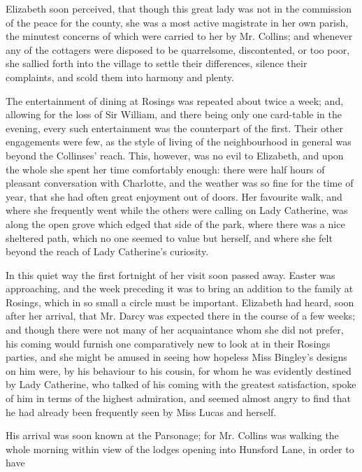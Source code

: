 Elizabeth soon perceived, that though this great lady was not in the commission of the peace for the county, she was a most active magistrate in her own parish, the minutest concerns of which were carried to her by Mr. Collins; and whenever any of the cottagers were disposed to be quarrelsome, discontented, or too poor, she sallied forth into the village to settle their differences, silence their complaints, and scold them into harmony and plenty.




The entertainment of dining at Rosings was repeated about twice a week; and, allowing for the loss of Sir William, and there being only one card-table in the evening, every such entertainment was the counterpart of the first. Their other engagements were few, as the style of living of the neighbourhood in general was beyond the Collinses' reach. This, however, was no evil to Elizabeth, and upon the whole she spent her time comfortably enough: there were half hours of pleasant conversation with Charlotte, and the weather was so fine for the time of year, that she had often great enjoyment out of doors. Her favourite walk, and where she frequently went while the others were calling on Lady Catherine, was along the open grove which edged that side of the park, where there was a nice sheltered path, which no one seemed to value but herself, and where she felt beyond the reach of Lady Catherine's curiosity.

In this quiet way the first fortnight of her visit soon passed away. Easter was approaching, and the week preceding it was to bring an addition to the family at Rosings, which in so small a circle must be important. Elizabeth had heard, soon after her arrival, that Mr. Darcy was expected there in the course of a few weeks; and though there were not many of her acquaintance whom she did not prefer, his coming would furnish one comparatively new to look at in their Rosings parties, and she might be amused in seeing how hopeless Miss Bingley's designs on him were, by his behaviour to his cousin, for whom he was evidently destined by Lady Catherine, who talked of his coming with the greatest satisfaction, spoke of him in terms of the highest admiration, and seemed almost angry to find that he had already been frequently seen by Miss Lucas and herself.

His arrival was soon known at the Parsonage; for Mr. Collins was walking the whole morning within view of the lodges opening into Hunsford Lane, in order to have



